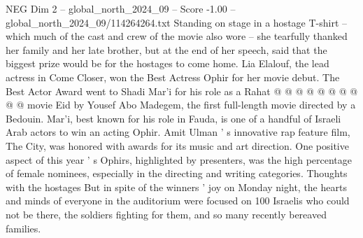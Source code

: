 \begin{textsample}{NEG Dim 2 – global\_north\_2024\_09 – Score -1.00 – global\_north\_2024\_09/114264264.txt}
Standing on stage in a hostage T-shirt -- which much of the cast and crew of the movie also wore -- she tearfully thanked her family and her late brother, but at the end of her speech, said that the biggest prize would be for the hostages to come home.
Lia Elalouf, the lead actress in Come Closer, won the Best Actress Ophir for her movie debut.
The Best Actor Award went to Shadi Mar'i for his role as a Rahat @ @ @ @ @ @ @ @ @ @ movie Eid by Yousef Abo Madegem, the first full-length movie directed by a Bedouin.
Mar'i, best known for his role in Fauda, is one of a handful of Israeli Arab actors to win an acting Ophir.
Amit Ulman ' s innovative rap feature film, The City, was honored with awards for its music and art direction.
One positive aspect of this year ' s Ophirs, highlighted by presenters, was the high percentage of female nominees, especially in the directing and writing categories.
Thoughts with the hostages But in spite of the winners ' joy on Monday night, the hearts and minds of everyone in the auditorium were focused on 100 Israelis who could not be there, the soldiers fighting for them, and so many recently bereaved families.

\end{textsample}
